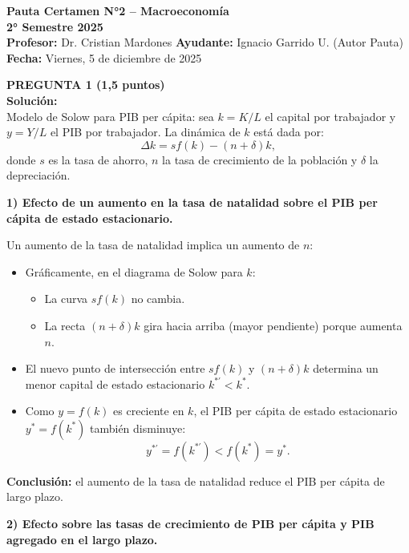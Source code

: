 \documentclass[11pt,addpoints]{article}
\begin{document}
\vspace*{0.1cm}

\begin{center}
{\Large \bfseries Pauta Certamen N°2 – Macroeconomía \\[0.25cm]}
\textbf{2° Semestre 2025}\\[0.3cm]
\textbf{Profesor:} Dr. Cristian Mardones \textbf{Ayudante:} Ignacio Garrido U. (Autor Pauta)\\[0.2cm]
\textbf{Fecha:} Viernes, 5 de diciembre de 2025
\end{center}

\vspace{0.4cm}

\textbf{PREGUNTA 1 (1,5 puntos)}\\
\textbf{Solución:}\\

Modelo de Solow para PIB per cápita: sea $k = K/L$ el capital por trabajador y $y = Y/L$ el PIB por trabajador. La dinámica de $k$ está dada por:
\[
\Delta k = s f(k) - (n + \delta)k,
\]
donde $s$ es la tasa de ahorro, $n$ la tasa de crecimiento de la población y $\delta$ la depreciación.

\medskip
\textbf{1) Efecto de un aumento en la tasa de natalidad sobre el PIB per cápita de estado estacionario.}

Un aumento de la tasa de natalidad implica un aumento de $n$:
\begin{itemize}
  \item Gráficamente, en el diagrama de Solow para $k$:
  \begin{itemize}
    \item La curva $sf(k)$ no cambia.
    \item La recta $(n + \delta)k$ gira hacia arriba (mayor pendiente) porque aumenta $n$.
  \end{itemize}
  \item El nuevo punto de intersección entre $sf(k)$ y $(n + \delta)k$ determina un menor capital de estado estacionario $k^{*'} < k^*$.
  \item Como $y = f(k)$ es creciente en $k$, el PIB per cápita de estado estacionario $y^* = f(k^*)$ también disminuye:
  \[
  y^{*'} = f(k^{*'}) < f(k^*) = y^*.
  \]
\end{itemize}

\textbf{Conclusión:} el aumento de la tasa de natalidad reduce el PIB per cápita de largo plazo.

\medskip
\textbf{2) Efecto sobre las tasas de crecimiento de PIB per cápita y PIB agregado en el largo plazo.}
\end{document}
